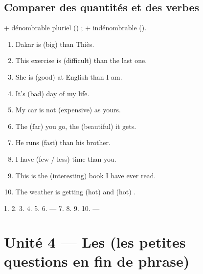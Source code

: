 \subsection{Comparer des quantités et des verbes}
\begin{memo}
 + dénombrable pluriel () ;
 + indénombrable ().
\end{memo}

\begin{exo}[3.1 --- Comparez]
\begin{enumerate}
  \item Dakar is (big) \trou[2cm] than Thiès.
  \item This exercise is (difficult) \trou[2.5cm] than the last one.
  \item She is (good) \trou[2.5cm] at English than I am.
  \item It's (bad) \trou[2cm] day of my life.
  \item My car is not (expensive) \trou[3cm] as yours.
  \item The (far) \trou[2cm] you go, the (beautiful) \trou[2.5cm] it gets.
  \item He runs (fast) \trou[2.5cm] than his brother.
  \item I have (few / less) \trou[2cm] time than you.
  \item This is the (interesting) \trou[2.5cm] book I have ever read.
  \item The weather is getting (hot) \trou[2cm] and (hot) \trou[2cm].
\end{enumerate}
\end{exo}
\begin{corrige}[3.1]
1.  2.  3.  4. 
5.  6.  ---  7. 
8.  9.  10.  --- 
\end{corrige}

\section{Unité 4 --- Les  (les petites questions en fin de phrase)}

